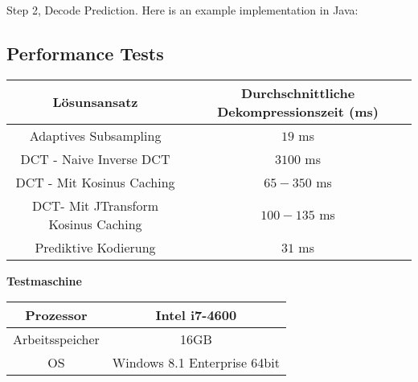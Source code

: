 Step 2, Decode Prediction. Here is an example implementation in Java:

\pagebreak

\subsection*{Performance Tests} \label{anhang:performance}
\begin{table}[!htbp]
\center
\begin{tabular}{c|c}
	Lösunsansatz & Durchschnittliche Dekompressionszeit (ms) \\\hline
	Adaptives Subsampling & $19$ ms \\
	DCT - Naive Inverse DCT & $3100$ ms \\
	DCT - Mit Kosinus Caching & $65-350$ ms\\
	DCT- Mit JTransform Kosinus Caching & $100-135$ ms\\
	Prediktive Kodierung & $31$ ms\\
\end{tabular}
\end{table}

\textbf{Testmaschine}
\begin{table}[!htbp]
\center
\begin{tabular}{c|c}
	Prozessor & Intel i7-4600 \\\hline
	Arbeitsspeicher & 16GB \\
	OS & Windows 8.1 Enterprise 64bit \\
\end{tabular}
\end{table}
